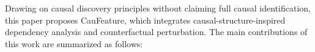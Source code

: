 \documentclass[journal]{IEEEtran}
\begin{document}
Drawing on causal discovery principles without claiming full causal identification, this paper proposes CauFeature, which integrates causal-structure-inspired dependency analysis and counterfactual perturbation. The main contributions of this work are summarized as follows:






\end{document}

